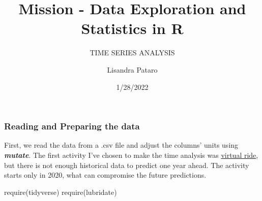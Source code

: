 \documentclass[
]{article}
\title{Mission - Data Exploration and Statistics in R}
\subtitle{TIME SERIES ANALYSIS}
\author{Lisandra Pataro}
\date{1/28/2022}
\newenvironment{Shaded}{\begin{snugshade}}{\end{snugshade}}
\newcommand{\FunctionTok}[1]{\textcolor[rgb]{0.00,0.00,0.00}{#1}}
\newcommand{\NormalTok}[1]{#1}
\begin{document}
\maketitle

\hypertarget{reading-and-preparing-the-data}{%
\subsubsection{Reading and Preparing the
data}\label{reading-and-preparing-the-data}}

First, we read the data from a .csv file and adjust the columns' units
using \textbf{\emph{mutate}}. The first activity I've chosen to make the
time analysis was \underline{virtual ride}, but there is not enough
historical data to predict one year ahead. The activity starts only in
2020, what can compromise the future predictions.

\begin{Shaded}
\begin{Highlighting}[]
\FunctionTok{require}\NormalTok{(tidyverse)}
\FunctionTok{require}\NormalTok{(lubridate)}
\end{Highlighting}
\end{Shaded}
\end{document}
